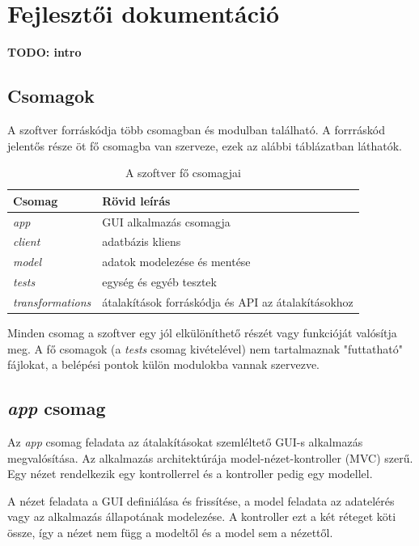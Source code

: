 \chapter{Fejlesztői dokumentáció}
\label{ch:impl}

\textbf{TODO: intro}

\section{Csomagok}

A szoftver forráskódja több csomagban és modulban található.
A forrráskód jelentős része öt fő csomagba van szerveze,
ezek az alábbi táblázatban láthatók.

\begin{table}[H]
	\centering
	\begin{tabular}{ | m{} | m{} | }
		\hline
		\textbf{Csomag} & \textbf{Rövid leírás} \\
		\hline \hline
		\emph{app} & GUI alkalmazás csomagja \\
		\hline
		\emph{client} & adatbázis kliens \\
		\hline
		\emph{model} & adatok modelezése és mentése \\
		\hline
		\emph{tests} & egység és egyéb tesztek \\
		\hline
		\emph{transformations} & átalakítások forráskódja és API az átalakításokhoz \\
		\hline
	\end{tabular}
	\caption{A szoftver fő csomagjai}
	\label{tab:packages}
\end{table}

Minden csomag a szoftver egy jól elkülöníthető részét vagy funkcióját valósítja meg.
A fő csomagok (a \emph{tests} csomag kivételével) nem tartalmaznak "futtatható" fájlokat,
a belépési pontok külön modulokba vannak szervezve.

\section{\emph{app} csomag}

Az \emph{app} csomag feladata az átalakításokat szemléltető GUI-s alkalmazás megvalósítása.
Az alkalmazás architektúrája model-nézet-kontroller (MVC) szerű.
Egy nézet rendelkezik egy kontrollerrel és a kontroller pedig egy modellel.

A nézet feladata a GUI definiálása és frissítése,
a model feladata az adatelérés vagy az alkalmazás állapotának modelezése.
A kontroller ezt a két réteget köti össze,
így a nézet nem függ a modeltől és a model sem a nézettől.

